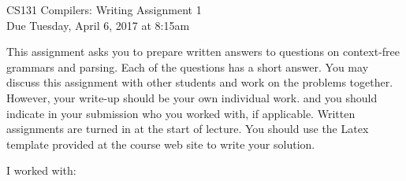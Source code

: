 \documentclass[10pt]{article}
\begin{document}
\begin{center}
\Large CS131 Compilers: Writing Assignment 1\\Due Tuesday, April 6, 2017 at 8:15am
\end{center}

\begin{center}
\LARGE
\end{center}

This assignment asks you to prepare written answers to questions on
context-free grammars and parsing. Each of the questions has a short answer. You
may discuss this assignment with other students and work on the problems
together. However, your write-up should be your own individual work.
and you should indicate in your submission who you worked with, if applicable.
Written assignments are turned in at the start of lecture.
You should use the Latex template provided at the course web site to write your solution.

\begin{center}
I worked with:
\end{center}
\end{document}
